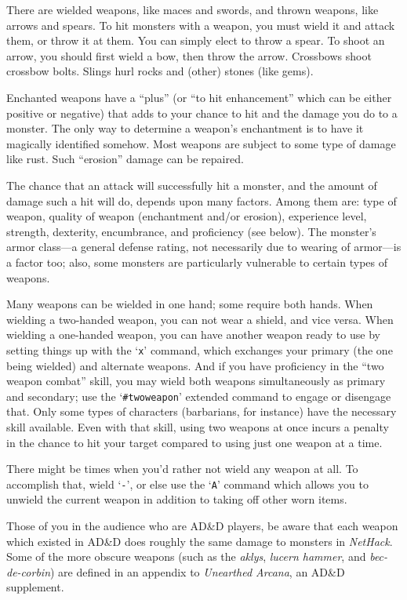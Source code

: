 There are wielded weapons, like maces and swords, and thrown weapons,
like arrows and spears.  To hit monsters with a weapon, you must wield it and
attack them, or throw it at them.  You can simply elect to throw a spear.
To shoot an arrow, you should first wield a bow, then throw the arrow.
Crossbows shoot crossbow bolts.  Slings hurl rocks and (other) stones
(like gems).

Enchanted weapons have a ``plus'' (or ``to hit enhancement'' which can be
either positive or negative) that adds to your chance to
hit and the damage you do to a monster.  The only way to determine a weapon's
enchantment is to have it magically identified somehow.
Most weapons are subject to some type of damage like rust.  Such
``erosion'' damage can be repaired.

The chance that an attack will successfully hit a monster, and the amount
of damage such a hit will do, depends upon many factors.  Among them are:
type of weapon, quality of weapon (enchantment and/or erosion), experience
level, strength, dexterity, encumbrance, and proficiency (see below).  The
monster's armor class---a general defense rating, not necessarily due to
wearing of armor---is a factor too; also, some monsters are particularly
vulnerable to certain types of weapons.

Many weapons can be wielded in one hand; some require both hands.
When wielding a two-handed weapon, you can not wear a shield, and
vice versa.  When wielding a one-handed weapon, you can have another
weapon ready to use by setting things up with the `{\tt x}' command, which
exchanges your primary (the one being wielded) and alternate weapons.
And if you have proficiency in the ``two weapon combat'' skill, you
may wield both weapons simultaneously as primary and secondary; use the
`{\tt \#twoweapon}' extended command to engage or disengage that.  Only
some types of characters (barbarians, for instance) have the necessary
skill available.  Even with that skill, using two weapons at once incurs
a penalty in the chance to hit your target compared to using just one
weapon at a time.

There might be times when you'd rather not wield any weapon at all.
To accomplish that, wield `{\tt -}', or else use the `{\tt A}' command which
allows you to unwield the current weapon in addition to taking off
other worn items.

Those of you in the audience who are AD\&D players, be aware that each
weapon which existed in AD\&D does roughly the same damage to monsters in
{\it NetHack}.  Some of the more obscure weapons (such as the %
{\it aklys}, {\it lucern hammer}, and {\it bec-de-corbin\/}) are defined
in an appendix to {\it Unearthed Arcana}, an AD\&D supplement.

